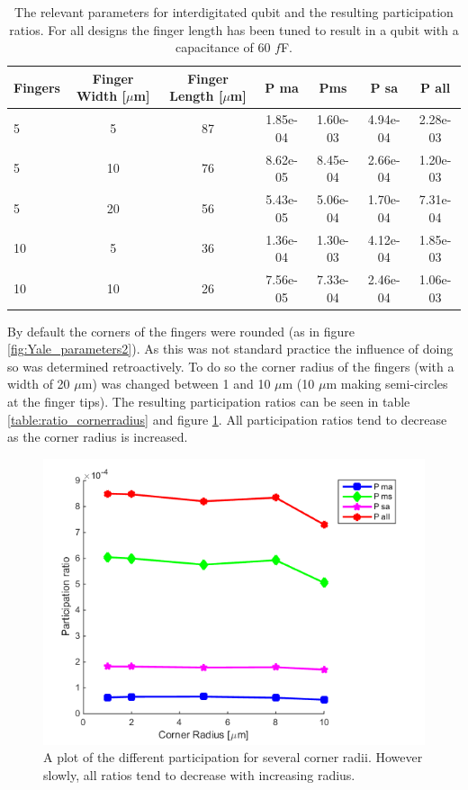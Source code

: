 \begin{table}
	\begin{center}
		\begin{tabular}{ | l || c | c || c | c | c | c |}
			\hline
			Fingers  & Finger Width [\(\mu\)m] & Finger Length [\(\mu\)m]  & P ma &  Pms & P sa & P all \\ \hline
			5 & 5 & 87 & 1.85e-04 & 1.60e-03 & 4.94e-04 & 2.28e-03 \\  
			5 & 10 & 76 & 8.62e-05 & 8.45e-04 & 2.66e-04 & 1.20e-03 \\
			5 & 20 & 56 & 5.43e-05 & 5.06e-04 & 1.70e-04 & 7.31e-04  \\
			10 & 5 & 36 & 1.36e-04 & 1.30e-03 & 4.12e-04 & 1.85e-03 \\
			10 & 10 & 26 & 7.56e-05 & 7.33e-04 & 2.46e-04 & 1.06e-03 \\
			\hline
		\end{tabular}
	\end{center}
	\caption{The relevant parameters for interdigitated qubit and the resulting participation ratios. For all designs the finger length has been tuned to result in a qubit with a capacitance of 60 \(f\)F. }
	\label{table:60fF_fingerlength}
\end{table}



By default the corners of the fingers were rounded (as in figure \ref{fig:Yale_parameters2}). As this was not standard practice the influence of doing so was determined retroactively. To do so the corner radius of the fingers (with a width of 20 \(\mu\)m) was changed between 1 and 10 \(\mu\)m (10 \(\mu\)m making semi-circles at the finger tips). The resulting participation ratios can be seen in table \ref{table:ratio_cornerradius} and figure \ref{fig:CornerRadius}. All participation ratios tend to decrease as the corner radius is increased. 

 \begin{figure}
 	\centering
 	\includegraphics[scale = 0.7]{Figures/Ratio_plots/CornerRadius_legend}
 	\caption{A plot of the different participation for several corner radii. However slowly, all ratios tend to decrease with increasing radius.}
 	\label{fig:CornerRadius}
 \end{figure}

